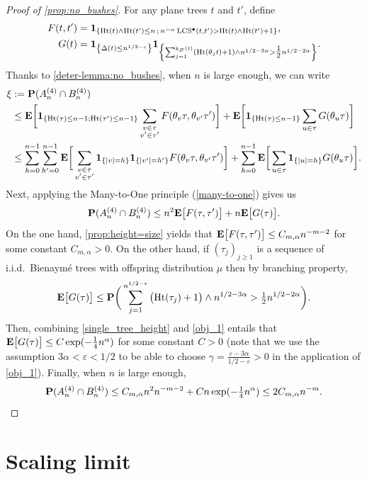 \documentclass[11pt,reqno]{amsart}
\newcommand{\Ht}{\mathrm{Ht}}
\newcommand{\rk}{\mathrm{k}}
\newcommand{\LCS}{\operatorname{LCS}}
\begin{document}
\begin{proof}[Proof of \cref{prop:no_bushes}]
For any plane trees $t$ and $t'$, define
\begin{align*} 
F(t,t')&=\I{\Ht(t)\wedge\Ht(t')\leq n\, ;\, n^{-\alpha}\LCS^\bullet(t,t')>\Ht(t)\wedge\Ht(t')+1},\\
G(t)&=\I{\Delta(t)\leq n^{1/2-\varepsilon}}\I{\sum_{j=1}^{\rk_\varnothing(t)}(\Ht(\theta_j t)+1)\wedge n^{1/2-3\alpha}>\tfrac{1}{2}n^{1/2-2\alpha}}.
\end{align*}
Thanks to \cref{deter-lemma:no_bushes}, when $n$ is large enough, we can write
\begin{align*}
\xi&:=\P(A_n^{(4)}\cap B_n^{(4)})\\
&\leq \E\bigg[\I{\Ht(\tau)\leq n-1;\Ht(\tau')\leq n-1} \sum_{\substack{v\in\tau \\ v'\in\tau'}} F(\theta_{v}\tau,\theta_{v'}\tau')\bigg]
+\E\bigg[\I{\Ht(\tau)\leq n-1}\sum_{u\in\tau}G(\theta_u\tau)\bigg]\\
&\leq \sum_{h=0}^{n-1}\sum_{h'=0}^{n-1} \E\bigg[\sum_{\substack{v\in\tau \\ v'\in\tau'}}\I{|v|=h}\I{|v'|=h'}F(\theta_{v}\tau,\theta_{v'}\tau')\bigg]+\sum_{h=0}^{n-1}\E\bigg[\sum_{u\in\tau}\I{|u|=h}G(\theta_u\tau)\bigg].
\end{align*}
Next, applying the Many-to-One principle (\cref{many-to-one}) gives us
\[\P(A_n^{(4)}\cap B_n^{(4)})\leq n^2\E\big[F(\tau,\tau')\big]+n\E\big[G(\tau)\big].\]
On the one hand, \cref{prop:height=size} yields that $\E\big[F(\tau,\tau')\big]\leq C_{m,\alpha} n^{-m-2}$ for some constant $C_{m,\alpha}>0$. On the other hand, if $(\tau_j)_{j\geq 1}$ is a sequence of i.i.d.~Bienaymé trees with offspring distribution $\mu$ then by branching property,
\[\E\big[G(\tau)\big]\leq \P\bigg(\sum_{j=1}^{n^{1/2-\varepsilon}}\big(\Ht(\tau_j)+1\big)\wedge n^{1/2-3\alpha}>\tfrac{1}{2}n^{1/2-2\alpha}\bigg).\]
Then, combining \cref{single_tree_height} and \cref{obj_1} entails that $\E\big[G(\tau)\big]\leq C\exp(-\tfrac{1}{4}n^\alpha)$ for some constant $C>0$ (note that we use the assumption $3\alpha<\varepsilon<1/2$ to be able to choose $\gamma=\tfrac{\varepsilon-3\alpha}{1/2-\varepsilon}>0$ in the application of \cref{obj_1}). Finally, when $n$ is large enough,
\[\P(A_n^{(4)}\cap B_n^{(4)})\leq C_{m,\alpha} n^2 n^{-m-2}+C n \exp(-\tfrac{1}{4}n^\alpha)\leq 2C_{m,\alpha}n^{-m}.\qedhere\]
\end{proof}


\section{Scaling limit}\label{sec:Scaling_limit}
\end{document}

